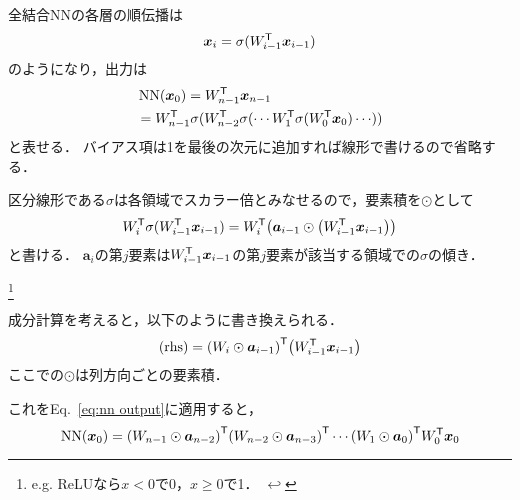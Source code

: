 \documentclass[dvipdfmx,autodetect-engine,12pt,fleqn]{jsarticle}
\DeclareMathOperator{\NN}{NN}
\newcounter{footnote-anchor}
\newcommand{\footnoteanchor}[1]{
    \hypertarget{footnote-anchor\arabic{footnote-anchor}}{}%
    \footnote{#1 \hyperlink{footnote-anchor\arabic{footnote-anchor}}{$\hookleftarrow$}}%
    \addtocounter{footnote-anchor}{1}
}
\begin{document}

全結合NNの各層の順伝播は
\[
\bm{x}_{i}=\sigma\lparen W_{i-1}^{\mathsf{T}} \bm{x}_{i-1}\rparen
\]
のようになり，出力は
\begin{equation}
\label{eq:nn output}
\begin{split}
&\NN\rbra{\layervector{0}}
    =\weightmatrixT{n-1}\layervector{n-1}\\
&=\weightmatrixT{n-1}\activation{\weightmatrixT{n-2}\activation{\cdots \weightmatrixT{1}\activation{\weightmatrixT{0}\layervector{0}} \cdots}}
\end{split}
\end{equation}
と表せる．
バイアス項は1を最後の次元に追加すれば線形で書けるので省略する．

\newcommand{\activeindex}[1]{\bm{a}_{#1}}
区分線形である$\sigma$は各領域でスカラー倍とみなせるので，要素積を$\odot$として
\begin{equation}
\label{eq:activation index}
\weightmatrixT{i} \activation{\weightmatrixT{i-1}\layervector{{i-1}}}
=\weightmatrixT{i}\qty(\activeindex{i-1}\odot\qty(\weightmatrixT{i-1}\layervector{i-1}))
\end{equation}
と書ける．
$\activeindex{i}$の第$j$要素は$W_{i-1}^{\mathsf{T}}\bm{x}_{i-1}$の第$j$要素が該当する領域での$\sigma$の傾き．
\footnoteanchor{e.g. ReLUなら$x<0$で0，$x\ge0$で1．}

成分計算を考えると，以下のように書き換えられる．
\begin{equation}
\label{eq:activation index 2}
\text{(rhs)}=\qty(\weightmatrix{i}\odot \activeindex{i-1})^\transpose \qty(\weightmatrixT{i-1}\layervector{i-1})
\end{equation}
ここでの$\odot$は列方向ごとの要素積．

これをEq.~\eqref{eq:nn output}に適用すると，
\begin{equation}
\label{eq:nn output 2}
\NN\rbra{\layervector{0}}=\qty(\weightmatrix{n-1}\odot \activeindex{n-2})^\transpose
\qty(\weightmatrix{n-2}\odot \activeindex{n-3})^\transpose \cdots
\qty(\weightmatrix{1}\odot \activeindex{0})^\transpose \weightmatrixT{0}\layervector{0}
\end{equation}
\end{document}
